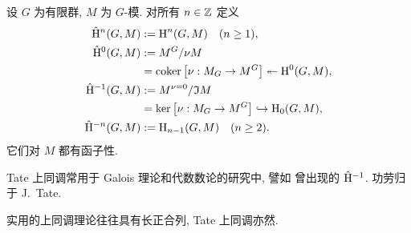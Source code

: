 \begin{definition}\label{def:TaHm}
	设 $G$ 为有限群, $M$ 为 $G$-模. 对所有 $n \in \mathbb{Z}$ 定义
	\begin{align*}
		\hat{\mathrm{H}}^n(G, M) & := \operatorname{H}^n(G, M) \quad (n \geq 1), \\
		\hat{\mathrm{H}}^0(G, M) & := M^G / \nu M \\
		& = \operatorname{coker}\left[ \nu: M_G \to M^G \right] \twoheadleftarrow \operatorname{H}^0(G, M), \\
		\hat{\mathrm{H}}^{-1}(G, M) & := M^{\nu=0} / \mathfrak{I} M \\
		& = \operatorname{ker}\left[ \nu: M_G \to M^G \right] \hookrightarrow \operatorname{H}_0(G, M), \\
		\hat{\mathrm{H}}^{-n}(G, M) & := \operatorname{H}_{n-1}(G, M) \quad (n \geq 2).
	\end{align*}
	它们对 $M$ 都有函子性.
\end{definition}

Tate 上同调常用于 Galois 理论和代数数论的研究中, 譬如 \cite[定义 9.6.3]{Li1} 曾出现的 $\hat{\mathrm{H}}^{-1}$. 功劳归于 J.\ Tate.

实用的上同调理论往往具有长正合列, Tate 上同调亦然.

